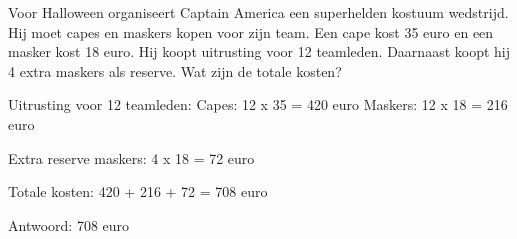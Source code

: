\begin{opgave}
Voor Halloween organiseert Captain America een superhelden kostuum wedstrijd. 
Hij moet capes en maskers kopen voor zijn team. Een cape kost 35 euro en een 
masker kost 18 euro. Hij koopt uitrusting voor 12 teamleden. Daarnaast koopt 
hij 4 extra maskers als reserve. Wat zijn de totale kosten?
\end{opgave}

\begin{oplossing}
Uitrusting voor 12 teamleden:
Capes: 12 x 35 = 420 euro
Maskers: 12 x 18 = 216 euro

Extra reserve maskers:
4 x 18 = 72 euro

Totale kosten:
420 + 216 + 72 = 708 euro

Antwoord: 708 euro
\end{oplossing}